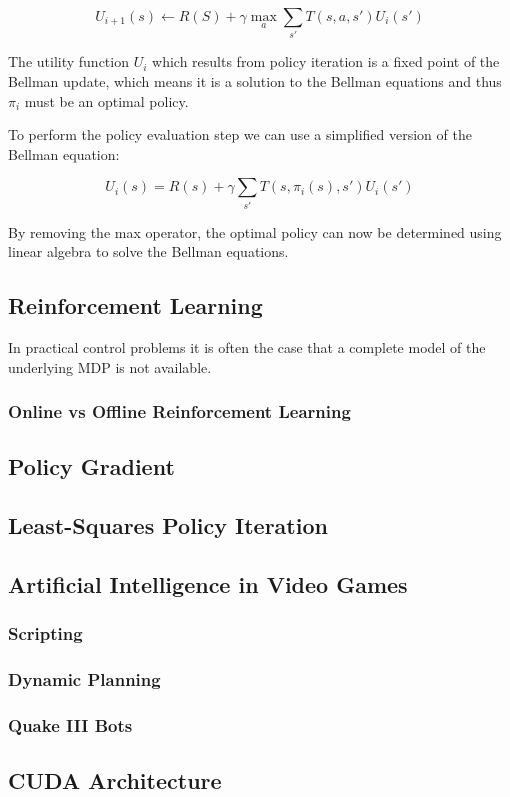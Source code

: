 \[
		U_{i+1}(s) \gets R(S) + \gamma \max_a \sum_{s'}T(s,a,s')U_i(s')
\]

The utility function $U_i$ which results from policy iteration is a fixed point of the Bellman update, which means it is a solution to the Bellman equations and thus $\pi_i$ must be an optimal policy.

To perform the policy evaluation step we can use a simplified version of the Bellman equation:

\[
		U_i(s) = R(s) + \gamma \sum_{s'} T(s, \pi_i(s), s')U_i(s')
\]

By removing the max operator, the optimal policy can now be determined using linear algebra to solve the Bellman equations.

\subsection{Reinforcement Learning}

In practical control problems it is often the case that a complete model of the underlying MDP is not available.

\subsubsection{Online vs Offline Reinforcement Learning}

\subsection{Policy Gradient}

\subsection{Least-Squares Policy Iteration}

\subsection{Artificial Intelligence in Video Games}

\subsubsection{Scripting}

\subsubsection{Dynamic Planning}

\subsubsection{Quake III Bots}

\subsection{CUDA Architecture}